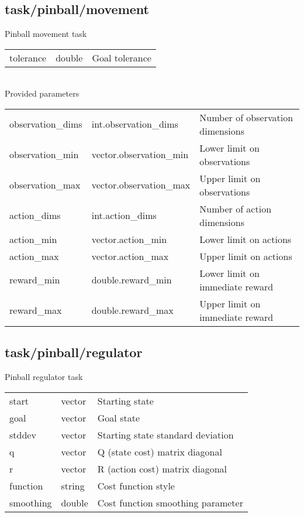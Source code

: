 \subsection{task/pinball/movement}
\noindent Pinball movement task\\

\noindent\begin{tabular}{@{}lll@{}}
tolerance&double&Goal tolerance\\
\end{tabular}
\\

\noindent Provided parameters\\

\noindent\begin{tabular}{@{}lll@{}}
observation\_dims&int.observation\_dims&Number of observation dimensions\\
observation\_min&vector.observation\_min&Lower limit on observations\\
observation\_max&vector.observation\_max&Upper limit on observations\\
action\_dims&int.action\_dims&Number of action dimensions\\
action\_min&vector.action\_min&Lower limit on actions\\
action\_max&vector.action\_max&Upper limit on actions\\
reward\_min&double.reward\_min&Lower limit on immediate reward\\
reward\_max&double.reward\_max&Upper limit on immediate reward\\
\end{tabular}
\subsection{task/pinball/regulator}
\noindent Pinball regulator task\\

\noindent\begin{tabular}{@{}lll@{}}
start&vector&Starting state\\
goal&vector&Goal state\\
stddev&vector&Starting state standard deviation\\
q&vector&Q (state cost) matrix diagonal\\
r&vector&R (action cost) matrix diagonal\\
function&string&Cost function style\\
smoothing&double&Cost function smoothing parameter\\
\end{tabular}
\\

